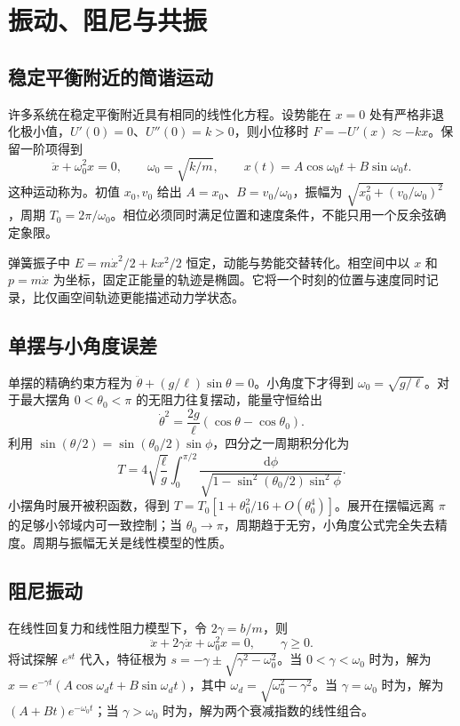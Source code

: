 \documentclass[UTF8,12pt,a4paper,fontset=fandol]{ctexbook}
\begin{document}
\chapter{振动、阻尼与共振}
\label{chap:mech-oscillation}

\section{稳定平衡附近的简谐运动}
许多系统在稳定平衡附近具有相同的线性化方程。设势能在 $x=0$ 处有严格非退化极小值，$U'(0)=0$、$U''(0)=k>0$，则小位移时 $F=-U'(x)\approx-kx$。保留一阶项得到
\begin{equation}
 \ddot x+\omega_0^2x=0,\qquad \omega_0=\sqrt{k/m},\qquad
 x(t)=A\cos\omega_0t+B\sin\omega_0t.
 \label{eq:mech-shm}
\end{equation}
这种运动称为。初值 $x_0,v_0$ 给出 $A=x_0$、$B=v_0/\omega_0$，振幅为 $\sqrt{x_0^2+(v_0/\omega_0)^2}$，周期 $T_0=2\pi/\omega_0$。相位必须同时满足位置和速度条件，不能只用一个反余弦确定象限。

弹簧振子中 $E=m\dot x^2/2+kx^2/2$ 恒定，动能与势能交替转化。相空间中以 $x$ 和 $p=m\dot x$ 为坐标，固定正能量的轨迹是椭圆。它将一个时刻的位置与速度同时记录，比仅画空间轨迹更能描述动力学状态。

\section{单摆与小角度误差}
单摆的精确约束方程为 $\ddot\theta+(g/\ell)\sin\theta=0$。小角度下才得到 $\omega_0=\sqrt{g/\ell}$。对于最大摆角 $0<\theta_0<\pi$ 的无阻力往复摆动，能量守恒给出
\[
 \dot\theta^2=\frac{2g}{\ell}(\cos\theta-\cos\theta_0).
\]
利用 $\sin(\theta/2)=\sin(\theta_0/2)\sin\phi$，四分之一周期积分化为
\begin{equation}
 T=4\sqrt{\frac\ell g}\int_0^{\pi/2}
 \frac{\mathrm d\phi}{\sqrt{1-\sin^2(\theta_0/2)\sin^2\phi}}.
 \label{eq:mech-pendulum-period}
\end{equation}
小摆角时展开被积函数，得到 $T=T_0[1+\theta_0^2/16+O(\theta_0^4)]$。展开在摆幅远离 $\pi$ 的足够小邻域内可一致控制；当 $\theta_0\to\pi$，周期趋于无穷，小角度公式完全失去精度。周期与振幅无关是线性模型的性质。

\section{阻尼振动}
在线性回复力和线性阻力模型下，令 $2\gamma=b/m$，则
\begin{equation}
 \ddot x+2\gamma\dot x+\omega_0^2x=0,\qquad \gamma\ge0.
 \label{eq:mech-damped}
\end{equation}
将试探解 $e^{st}$ 代入，特征根为 $s=-\gamma\pm\sqrt{\gamma^2-\omega_0^2}$。当 $0<\gamma<\omega_0$ 时为，解为 $x=e^{-\gamma t}(A\cos\omega_dt+B\sin\omega_dt)$，其中 $\omega_d=\sqrt{\omega_0^2-\gamma^2}$。当 $\gamma=\omega_0$ 时为，解为 $(A+Bt)e^{-\omega_0t}$；当 $\gamma>\omega_0$ 时为，解为两个衰减指数的线性组合。
\end{document}
